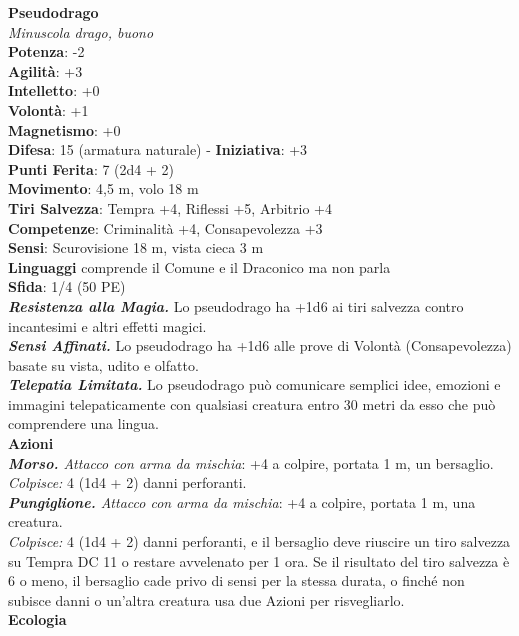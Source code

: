 \begin{multicols}{2}
\medskip\textbf{Pseudodrago}\\
\emph{Minuscola drago, buono}\\
\textbf{Potenza}: -2\\
\textbf{Agilità}: +3\\
\textbf{Intelletto}: +0\\
\textbf{Volontà}: +1\\
\textbf{Magnetismo}: +0\\
\textbf{Difesa}: 15 (armatura naturale) - \textbf{Iniziativa}: +3\\
\textbf{Punti Ferita}: 7 (2d4 + 2)\\
\textbf{Movimento}: 4,5 m, volo 18 m\\
\textbf{Tiri Salvezza}: Tempra +4, Riflessi +5, Arbitrio +4\\
\textbf{Competenze}: Criminalità +4, Consapevolezza +3\\
\textbf{Sensi}: Scurovisione 18 m, vista cieca 3 m\\
\textbf{Linguaggi} comprende il Comune e il Draconico ma non parla\\
\textbf{Sfida}: 1/4 (50 PE)\smallskip\\
\emph{\textbf{Resistenza alla Magia.}} Lo pseudodrago ha +1d6 ai tiri salvezza contro incantesimi e altri effetti magici.\\
\emph{\textbf{Sensi Affinati.}} Lo pseudodrago ha +1d6 alle prove di Volontà (Consapevolezza) basate su vista, udito e olfatto.\\
\emph{\textbf{Telepatia Limitata.}} Lo pseudodrago può comunicare semplici idee, emozioni e immagini telepaticamente con qualsiasi creatura entro 30 metri da esso che può comprendere una lingua. \\
\smallskip\textbf{Azioni}\\
\emph{\textbf{Morso.} Attacco con arma da mischia}: +4 a colpire, portata 1 m, un bersaglio.\\
\emph{Colpisce:} 4 (1d4 + 2) danni perforanti.\\
\emph{\textbf{Pungiglione.} Attacco con arma da mischia}: +4 a colpire, portata 1 m, una creatura.\\
\emph{Colpisce:} 4 (1d4 + 2) danni perforanti, e il bersaglio deve riuscire un tiro salvezza su Tempra DC 11 o restare avvelenato per 1 ora. Se il risultato del tiro salvezza è 6 o meno, il bersaglio cade privo di sensi per la stessa durata, o finché non subisce danni o un'altra creatura usa due Azioni per risvegliarlo.\\
\textbf{Ecologia}\\

\end{multicols}
